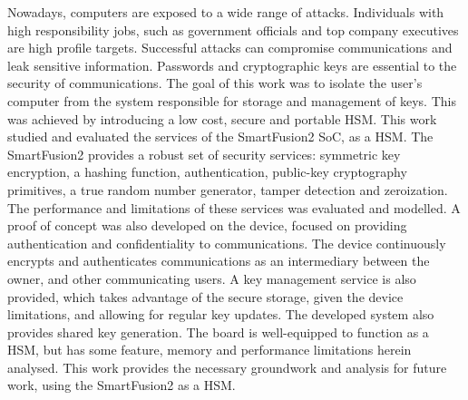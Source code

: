 \noindent Nowadays, computers are exposed to a wide range of attacks. Individuals with high responsibility jobs, such as government officials and top company executives are high profile targets. Successful attacks can compromise communications and leak sensitive information. Passwords and cryptographic keys are essential to the security of communications. The goal of this work was to isolate the user's computer from the system responsible for storage and management of keys. This was achieved by introducing a low cost, secure and portable \ac{HSM}. This work studied and evaluated the services of the SmartFusion2 \ac{SoC}, as a HSM. The SmartFusion2 provides a robust set of security services: symmetric key encryption, a hashing function, authentication, public-key cryptography primitives, a true random number generator, tamper detection and zeroization. The performance and limitations of these services was evaluated and modelled. A proof of concept was also developed on the device, focused on providing authentication and confidentiality to communications. The device continuously encrypts and authenticates communications as an intermediary between the owner, and other communicating users. A key management service is also provided, which takes advantage of the secure storage, given the device limitations, and allowing for regular key updates. The developed system also provides shared key generation. The board is well-equipped to function as a HSM, but has some feature, memory and performance limitations herein analysed. This work provides the necessary groundwork and analysis for future work, using the SmartFusion2 as a HSM.
